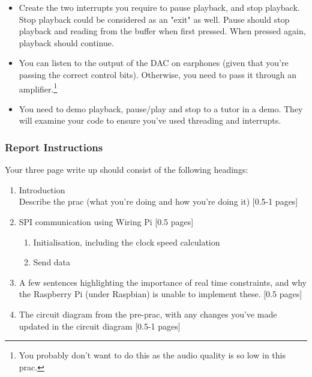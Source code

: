 \begin{itemize}
    \item Create the two interrupts you require to pause playback, and stop playback. Stop playback could be considered as an "exit" as well. Pause should stop playback and reading from the buffer when first pressed. When pressed again, playback should continue.
    \item You can listen to the output of the DAC on earphones (given that you're passing the correct control bits). Otherwise, you need to pass it through an amplifier.\footnote{You probably don't want to do this as the audio quality is so low in this prac.}
    \item You need to demo playback, pause/play and stop to a tutor in a demo. They will examine your code to ensure you've used threading and interrupts.
\end{itemize}

\subsubsection{Report Instructions}
Your three page write up should consist of the following headings:
\begin{enumerate}
    \item Introduction\\
    Describe the prac (what you're doing and how you're doing it) [0.5-1 pages]
    \item SPI communication using Wiring Pi [0.5 pages]
    \begin{enumerate}
    \item Initialisation, including the clock speed calculation
    \item Send data
    \end{enumerate}
    \item A few sentences highlighting the importance of real time constraints, and why the Raspberry Pi (under Raspbian) is unable to implement these. [0.5 pages]
    \item The circuit diagram from the pre-prac, with any changes you've made updated in the circuit diagram [0.5-1 pages]
\end{enumerate}


